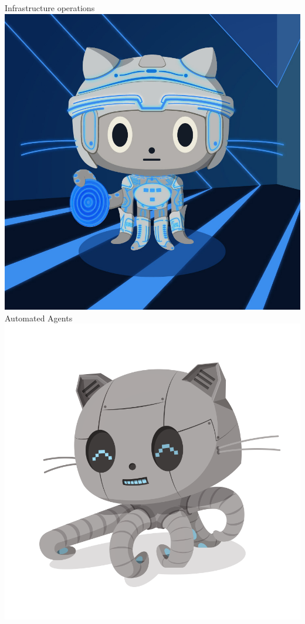 \documentclass[17pt, a0paper, landscape, margin=0mm, innermargin=15mm,
     blockverticalspace=5mm, colspace=5mm, subcolspace=8mm]{tikzposter} %
\begin{document}
\begin{columns}
{         Infrastructure operations
         \includegraphics[scale=0.05]{img/octotron.jpg}
         Automated Agents
         \includegraphics[scale=0.05]{img/robotcat.png}
         }
\end{columns}
\end{document}
